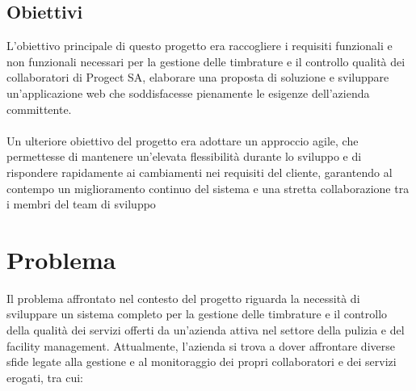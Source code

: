 \documentclass[twoside]{supsistudent}
\begin{document}
\section{Obiettivi}
L'obiettivo principale di questo progetto era raccogliere i requisiti funzionali e non funzionali necessari per la gestione delle timbrature e il controllo qualità dei collaboratori di Progect SA, elaborare una proposta di soluzione e sviluppare un'applicazione web che soddisfacesse pienamente le esigenze dell'azienda committente.
\\\\
Un ulteriore obiettivo del progetto era adottare un approccio agile, che permettesse di mantenere un'elevata flessibilità durante lo sviluppo e di rispondere rapidamente ai cambiamenti nei requisiti del cliente, garantendo al contempo un miglioramento continuo del sistema e una stretta collaborazione tra i membri del team di sviluppo

\chapter{Problema}
Il problema affrontato nel contesto del progetto riguarda la necessità di sviluppare un sistema completo per la gestione delle timbrature e il controllo della qualità dei servizi offerti da un'azienda attiva nel settore della pulizia e del facility management. Attualmente, l'azienda si trova a dover affrontare diverse sfide legate alla gestione e al monitoraggio dei propri collaboratori e dei servizi erogati, tra cui:
\end{document}
